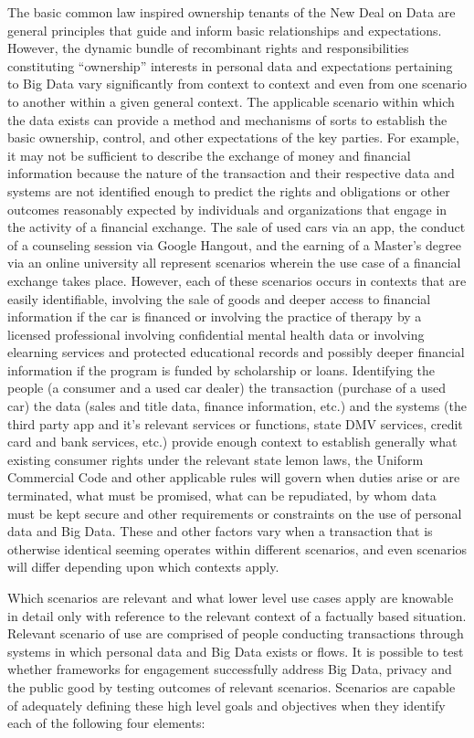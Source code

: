 The basic common law inspired ownership tenants of the New Deal on Data are general principles that guide and inform basic relationships and expectations.
However, the dynamic bundle of recombinant rights and responsibilities constituting ``ownership'' interests in personal data and expectations pertaining to Big Data vary significantly from context to context and even from one scenario to another within a given general context.
The applicable scenario within which the data exists can provide a method and mechanisms of sorts to establish the basic ownership, control, and other expectations of the key parties.
For example, it may not be sufficient to describe the exchange of money and financial information because the nature of the transaction and their respective data and systems are not identified enough to predict the rights and obligations or other outcomes reasonably expected by individuals and organizations that engage in the activity of a financial exchange.
The sale of used cars via an app, the conduct of a counseling session via Google Hangout, and the earning of a Master's degree via an online university all represent scenarios wherein the use case of a financial exchange takes place. 
However, each of these scenarios occurs in contexts that are easily identifiable, involving the sale of goods and deeper access to financial information if the car is financed or involving the practice of therapy by a licensed professional involving confidential mental health data or involving elearning services and protected educational records and possibly deeper financial information if the program is funded by scholarship or loans.
Identifying the people (a consumer and a used car dealer) the transaction (purchase of a used car) the data (sales and title data, finance information, etc.) and the systems (the third party app and it's relevant services or functions, state DMV services, credit card and bank services, etc.) provide enough context to establish generally what existing consumer rights under the relevant state lemon laws, the Uniform Commercial Code and other applicable rules will govern when duties arise or are terminated, what must be promised, what can be repudiated, by whom data must be kept secure and other requirements or constraints on the use of personal data and Big Data.
These and other factors vary when a transaction that is otherwise identical seeming operates within different scenarios, and even scenarios will differ depending upon which contexts apply.  

Which scenarios are relevant and what lower level use cases apply are knowable in detail only with reference to the relevant context of a factually based situation.
Relevant scenario of use are comprised of people conducting transactions through systems in which personal data and Big Data exists or flows.
It is possible to test whether frameworks for engagement successfully address Big Data, privacy and the public good by testing outcomes of relevant scenarios.
Scenarios are capable of adequately defining these high level goals and objectives when they identify each of the following four elements:  

